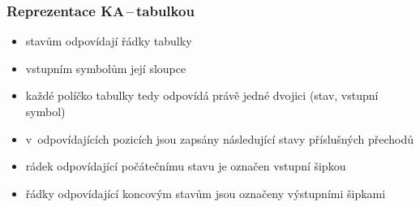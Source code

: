 \documentclass[hyperref={unicode}]{beamer}
\begin{document}
\begin{frame}
\transblindshorizontal
\frametitle{Reprezentace KA\,--\,tabulkou}
\begin{alertblock}{}
\begin{itemize}
\pause
\item{stavům odpovídají řádky tabulky}
\pause
\item{vstupním symbolům její sloupce}
\pause
\item{každé políčko tabulky tedy odpovídá právě jedné dvojici (stav, vstupní symbol)}
\pause
\item{v~odpovídajících pozicích jsou zapsány následující stavy příslušných přechodů}
\pause
\item{rádek odpovídající počátečnímu stavu je označen vstupní šipkou}
\pause
\item{řádky odpovídající koncovým stavům jsou označeny výstupními šipkami}
\pause
\end{itemize}
\end{alertblock}
\begin{figure}[h]
		\centering
\end{figure}
\end{frame}
\end{document}
